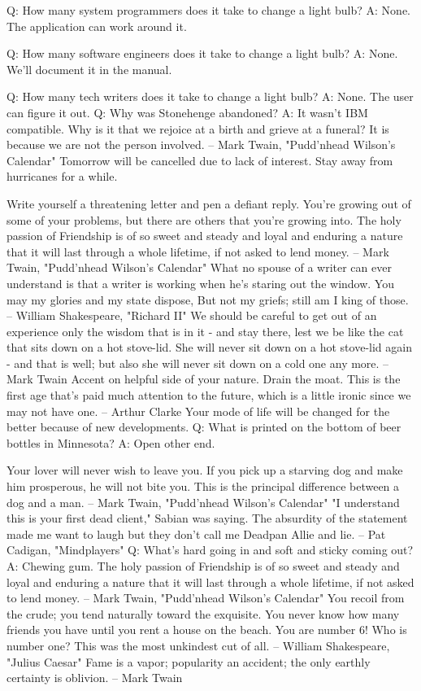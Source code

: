 Q:	How many system programmers does it take to change a light bulb?
A:	None.  The application can work around it.

Q:	How many software engineers does it take to change a light bulb?
A:	None.  We'll document it in the manual.

Q:	How many tech writers does it take to change a light bulb?
A:	None.  The user can figure it out.
Q:	Why was Stonehenge abandoned?
A:	It wasn't IBM compatible.
Why is it that we rejoice at a birth and grieve at a funeral?  It is because we
are not the person involved.
		-- Mark Twain, "Pudd'nhead Wilson's Calendar"
Tomorrow will be cancelled due to lack of interest.
Stay away from hurricanes for a while.

Write yourself a threatening letter and pen a defiant reply.
You're growing out of some of your problems, but there are others that
you're growing into.
The holy passion of Friendship is of so sweet and steady and loyal and
enduring a nature that it will last through a whole lifetime, if not asked to
lend money.
		-- Mark Twain, "Pudd'nhead Wilson's Calendar"
What no spouse of a writer can ever understand is that a writer is working
when he's staring out the window.
You may my glories and my state dispose,
But not my griefs; still am I king of those.
		-- William Shakespeare, "Richard II"
We should be careful to get out of an experience only the wisdom that is
in it - and stay there, lest we be like the cat that sits down on a hot
stove-lid.  She will never sit down on a hot stove-lid again - and that
is well; but also she will never sit down on a cold one any more.
		-- Mark Twain
Accent on helpful side of your nature.  Drain the moat.
This is the first age that's paid much attention to the future, which is a
little ironic since we may not have one.
		-- Arthur Clarke
Your mode of life will be changed for the better because of new developments.
Q:	What is printed on the bottom of beer bottles in Minnesota?
A:	Open other end.

Your lover will never wish to leave you.
If you pick up a starving dog and make him prosperous, he will not bite you.
This is the principal difference between a dog and a man.
		-- Mark Twain, "Pudd'nhead Wilson's Calendar"
"I understand this is your first dead client," Sabian was saying.  The
absurdity of the statement made me want to laugh but they don't call me
Deadpan Allie and lie.
		-- Pat Cadigan, "Mindplayers"
Q:	What's hard going in and soft and sticky coming out?
A:	Chewing gum.
The holy passion of Friendship is of so sweet and steady and loyal and
enduring a nature that it will last through a whole lifetime, if not asked to
lend money.
		-- Mark Twain, "Pudd'nhead Wilson's Calendar"
You recoil from the crude; you tend naturally toward the exquisite.
You never know how many friends you have until you rent a house on the beach.
You are number 6!  Who is number one?
This was the most unkindest cut of all.
		-- William Shakespeare, "Julius Caesar"
Fame is a vapor; popularity an accident; the only earthly certainty is
oblivion.
		-- Mark Twain

